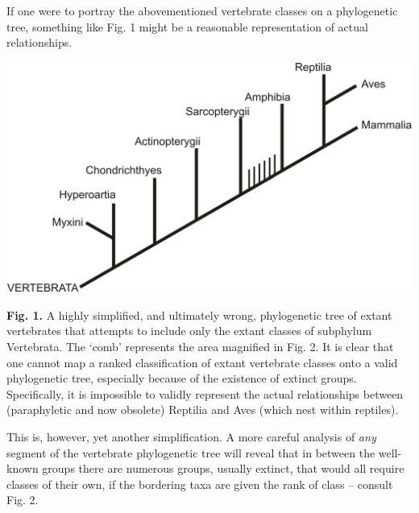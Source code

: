 \begin{artengenv}
If one were to portray the abovementioned vertebrate classes on a phylogenetic tree, something like Fig. 1 might be a
reasonable representation of actual relationships.

{\centering  \includegraphics{Lamzaorg-img001.pdf} \par}
\textbf{Fig. 1. }A highly simplified, and ultimately wrong, phylogenetic tree of extant vertebrates that attempts to
include only the extant classes of subphylum Vertebrata. The ‘comb’ represents the area magnified in Fig. 2. It is
clear that one cannot map a ranked classification of extant vertebrate classes onto a valid phylogenetic tree,
especially because of the existence of extinct groups. Specifically, it is impossible to validly represent the actual
relationships between (paraphyletic and now obsolete) Reptilia and Aves (which nest within reptiles).

This is, however, yet another simplification. A more careful analysis of \textit{any }segment of the vertebrate
phylogenetic tree will reveal that in between the well-known groups there are numerous groups, usually extinct, that
would all require classes of their own, if the bordering taxa are given the rank of class – consult Fig. 2.


\end{artengenv}
